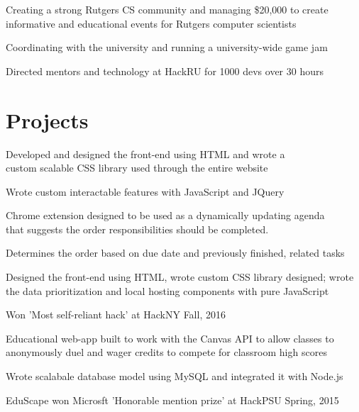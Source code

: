 \documentclass[]{deedy-resume-openfont}
\begin{document}
\begin{minipage}[t]{0.66\textwidth}
\begin{tightemize}
\item Creating a strong Rutgers CS community and managing \$20,000 to create informative and educational events for Rutgers computer scientists
\item Coordinating with the university and running a university-wide  game jam
\item Directed mentors and technology at HackRU for 1000 devs over 30 hours
\end{tightemize}
\sectionsep


\section{Projects}
\begin{tightemize}
\item Developed and designed the front-end using HTML and wrote a \\custom scalable CSS library used through the entire website 
\item Wrote custom interactable features with JavaScript and JQuery 
\end{tightemize}
\sectionsep

\begin{tightemize}
\item Chrome extension designed to be used as a dynamically updating agenda \\that suggests the order responsibilities should be completed. 
\item Determines the order based on due date and previously finished, related tasks
\item Designed the front-end using HTML, wrote custom CSS library designed; wrote \\the data prioritization and local hosting components with pure JavaScript 
\item Won 'Most self-reliant hack' at HackNY Fall, 2016
\end{tightemize}
\sectionsep

\begin{tightemize}
\item Educational web-app built to work with the Canvas API to allow classes to anonymously duel and wager credits to compete for classroom high scores
\item Wrote scalabale database model using MySQL and integrated it with Node.js 
\item EduScape won Microsft 'Honorable mention prize' at HackPSU Spring, 2015
\end{tightemize}
\sectionsep

\end{minipage} 
\end{document}
